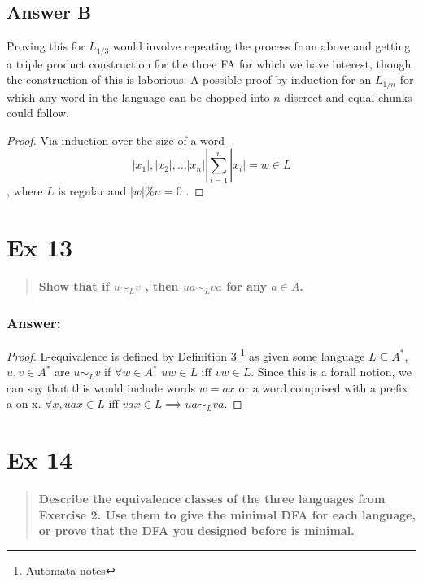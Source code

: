 \documentclass[titlepage]{article}\usepackage[]{graphicx}\usepackage[]{color}
\begin{document}
\subsection{Answer B}
Proving this for $L_{1/3}$ would involve repeating the process from above and
getting a triple product construction for the three FA for which we have
interest, though the construction of this is laborious. 
A possible proof by induction for an $L_{1/n}$ for which any word in the
language can be chopped into $n$ discreet and equal chunks could follow. 

\begin{proof}
  Via induction over the size of a word 
  \[ |x_1|, |x_2|, \dots |x_n| | \sum_{i=1}^n |x_i| = w \in L \]
  , where $L$ is regular and $|w|\%n=0 $ .

\end{proof}




\section*{Ex 13}
\begin{quote}
  \textbf{Show that if $u \sim_L v$ , then $u a \sim_L v a$ for any $a \in A$.}
\end{quote}
\subsubsection{Answer:}

\begin{proof}
L-equivalence is defined by Definition 3 \footnote{Automata notes} as given some
language $L \subseteq A^*$, $u,v \in A^*$ are $u \sim_L v$ if $\forall w \in
A^*\, \, uw \in L \text{ iff } vw \in L$. 
Since this is a forall notion, we can say that this would include words $w = ax$
or a word comprised with a prefix a on x. $\forall x, uax \in L \text{ iff } vax \in
L \implies ua \sim_L va$.
\end{proof}


\section*{Ex 14}
\begin{quote}
  \textbf{Describe the equivalence classes of the three languages from Exercise
  2. Use them to give the minimal DFA for each language, or prove that the DFA
  you designed before is minimal.}
\end{quote}
\end{document}

